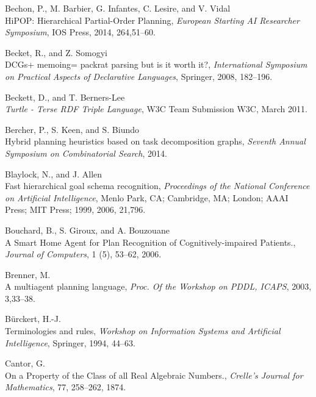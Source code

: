 \documentclass[11pt,a4paper,twoside,openright,titlepage,numbers=noenddot,headinclude,cleardoublepage=empty,openany]{scrreprt}
\theoremstyle{plain}
\theoremstyle{definition}
\theoremstyle{remark}
\begin{document}
\leavevmode\hypertarget{ref-bechon_hipop_2014}{}%
Bechon, P., M. Barbier, G. Infantes, C. Lesire, and V. Vidal\\
HiPOP: Hierarchical Partial-Order Planning, \emph{European Starting AI
Researcher Symposium}, IOS Press, 2014, 264,51--60.

\leavevmode\hypertarget{ref-becket_dcgs_2008}{}%
Becket, R., and Z. Somogyi\\
DCGs+ memoing= packrat parsing but is it worth it?, \emph{International
Symposium on Practical Aspects of Declarative Languages}, Springer,
2008, 182--196.

\leavevmode\hypertarget{ref-beckett_turtle_2011}{}%
Beckett, D., and T. Berners-Lee\\
\emph{Turtle - Terse RDF Triple Language}, W3C Team Submission W3C,
March 2011.

\leavevmode\hypertarget{ref-bercher_hybrid_2014}{}%
Bercher, P., S. Keen, and S. Biundo\\
Hybrid planning heuristics based on task decomposition graphs,
\emph{Seventh Annual Symposium on Combinatorial Search}, 2014.

\leavevmode\hypertarget{ref-blaylock_fast_2006}{}%
Blaylock, N., and J. Allen\\
Fast hierarchical goal schema recognition, \emph{Proceedings of the
National Conference on Artificial Intelligence}, Menlo Park, CA;
Cambridge, MA; London; AAAI Press; MIT Press; 1999, 2006, 21,796.

\leavevmode\hypertarget{ref-bouchard_smart_2006}{}%
Bouchard, B., S. Giroux, and A. Bouzouane\\
A Smart Home Agent for Plan Recognition of Cognitively-impaired
Patients., \emph{Journal of Computers}, 1 (5), 53--62, 2006.

\leavevmode\hypertarget{ref-brenner_multiagent_2003}{}%
Brenner, M.\\
A multiagent planning language, \emph{Proc. Of the Workshop on PDDL,
ICAPS}, 2003, 3,33--38.

\leavevmode\hypertarget{ref-burckert_terminologies_1994}{}%
Bürckert, H.-J.\\
Terminologies and rules, \emph{Workshop on Information Systems and
Artificial Intelligence}, Springer, 1994, 44--63.

\leavevmode\hypertarget{ref-cantor_property_1874}{}%
Cantor, G.\\
On a Property of the Class of all Real Algebraic Numbers.,
\emph{Crelle's Journal for Mathematics}, 77, 258--262, 1874.
\end{document}
